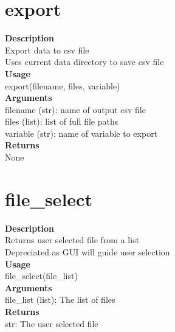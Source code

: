 \documentclass[11pt, oneside]{article}
\begin{document}

\section{export}

\textbf{Description} \\
        Export data to csv file\\
        Uses current data directory to save csv file\\

\noindent\textbf{Usage} \\
        export(filename, files, variable) \\

\noindent\textbf{Arguments} \\
        filename (str): name of output csv file\\
        files (list): list of full file paths\\
        variable (str): name of variable to export\\

\noindent\textbf{Returns} \\
        None\\


\section{file\_select}

\textbf{Description} \\
        Returns user selected file from a list\\
        Depreciated as GUI will guide user selection\\

\noindent\textbf{Usage} \\
        file\_select(file\_list) \\

\noindent\textbf{Arguments} \\
        file\_list (list): The list of files\\

\noindent\textbf{Returns} \\
        str: The user selected file\\
\end{document}

